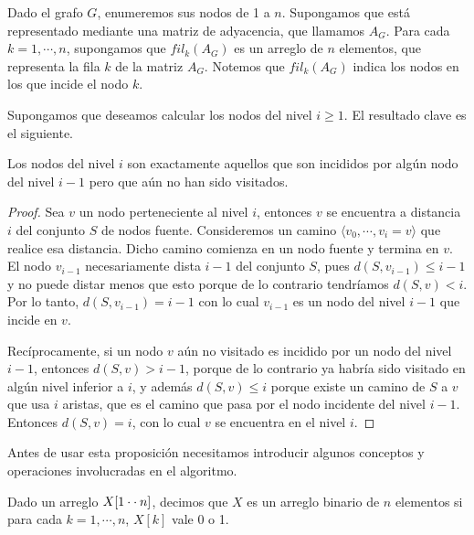 Dado el grafo $G$, enumeremos sus nodos de 1 a $n$. Supongamos que está representado mediante una matriz de adyacencia, que llamamos $A_G$. Para cada $k = 1, \cdots, n$, supongamos que $fil_k(A_G)$ es un arreglo de $n$ elementos, que representa la fila $k$ de la matriz $A_G$. Notemos que $fil_k(A_G)$ indica los nodos en los que incide el nodo $k$.

Supongamos que deseamos calcular los nodos del nivel $i \geq 1$. El resultado clave es el siguiente.

\begin{prop}
\label{prop:prop1}
Los nodos del nivel $i$ son exactamente aquellos que son incididos por algún nodo del nivel $i - 1$ pero que aún no han sido visitados.
\begin{proof}
Sea $v$ un nodo perteneciente al nivel $i$, entonces $v$ se encuentra a distancia $i$ del conjunto $S$ de nodos fuente. Consideremos un camino $\langle v_0, \cdots, v_i = v \rangle$ que realice esa distancia. Dicho camino comienza en un nodo fuente y termina en $v$. El nodo $v_{i - 1}$ necesariamente dista $i - 1$ del conjunto $S$, pues $d(S, v_{i - 1}) \leq i - 1$ y no puede distar menos que esto porque de lo contrario tendríamos $d(S, v) < i$. Por lo tanto, $d(S, v_{i - 1}) = i - 1$ con lo cual $v_{i - 1}$ es un nodo del nivel $i - 1$ que incide en $v$.

Recíprocamente, si un nodo $v$ aún no visitado es incidido por un nodo del nivel $i - 1$, entonces $d(S, v) > i - 1$, porque de lo contrario ya habría sido visitado en algún nivel inferior a $i$, y además $d(S, v) \leq i$ porque existe un camino de $S$ a $v$ que usa $i$ aristas, que es el camino que pasa por el nodo incidente del nivel $i - 1$. Entonces $d(S, v) = i$, con lo cual $v$ se encuentra en el nivel $i$.
\end{proof}
\end{prop}

Antes de usar esta proposición necesitamos introducir algunos conceptos y operaciones involucradas en el algoritmo.

\begin{defi}
Dado un arreglo $X[1\cdot\cdot\hspace{0.75mm} n]$, decimos que $X$ es un arreglo binario de $n$ elementos si para cada $k = 1, \cdots, n$, $X[k]$ vale 0 o 1.
\end{defi}

